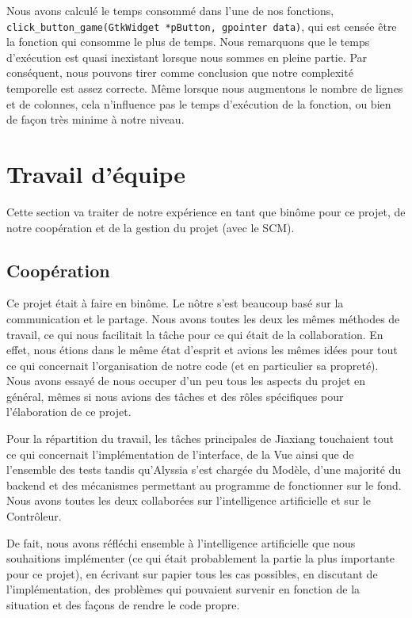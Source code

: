 \documentclass[a4paper, 11pt, oneside]{article}
\begin{document}
Nous avons calculé le temps consommé dans l'une de nos fonctions, \texttt{click\_button\_game(GtkWidget *pButton, gpointer data)}, qui est censée être la fonction qui consomme le plus de temps. Nous remarquons que le temps d'exécution est quasi inexistant lorsque nous sommes en pleine partie. Par conséquent, nous pouvons tirer comme conclusion que notre complexité temporelle est assez correcte. Même lorsque nous augmentons le nombre de lignes et de colonnes, cela n'influence pas le temps d'exécution de la fonction, ou bien de façon très minime à notre niveau.
\section{Travail d'équipe}

Cette section va traiter de notre expérience en tant que binôme pour ce projet, de notre coopération et de la gestion du projet (avec le SCM).

\subsection{Coopération}
Ce projet était à faire en binôme. Le nôtre s'est beaucoup basé sur la communication et le partage. Nous avons toutes les deux les mêmes méthodes de travail, ce qui nous facilitait la tâche pour ce qui était de la collaboration. En effet, nous étions dans le même état d'esprit et avions les mêmes idées pour tout ce qui concernait l'organisation de notre code (et en particulier sa propreté). Nous avons essayé de nous occuper d'un peu tous les aspects du projet en général, mêmes si nous avions des tâches et des rôles spécifiques pour l'élaboration de ce projet.

Pour la répartition du travail, les tâches principales de Jiaxiang touchaient tout ce qui concernait l'implémentation de l'interface, de la Vue ainsi que de l'ensemble des tests tandis qu'Alyssia s'est chargée du Modèle, d'une majorité du backend et des mécanismes permettant au programme de fonctionner sur le fond. Nous avons toutes les deux collaborées sur l'intelligence artificielle et sur le Contrôleur.

De fait, nous avons réfléchi ensemble à l'intelligence artificielle que nous souhaitions implémenter (ce qui était probablement la partie la plus importante pour ce projet), en écrivant sur papier tous les cas possibles, en discutant de l'implémentation, des problèmes qui pouvaient survenir en fonction de la situation et des façons de rendre le code propre.
\end{document}
